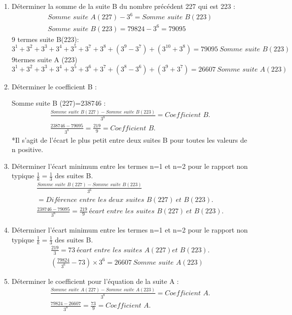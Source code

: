 \documentclass[11pt,a4paper]{article}
\begin{document}
\begin{enumerate}[label=\arabic*.,leftmargin=*,itemsep=6pt]
\item Déterminer la somme de la suite B du nombre précédent 227 qui est 223 :
\begin{gather*}
\textit{Somme suite A}(227)-3^{6}=\textit{Somme suite B}(223)\\
\textit{Somme suite B}(223)=79824-3^{6}=79095
\end{gather*}
9 termes suite B(223):
\[
3^{1}+3^{2}+3^{3}+3^{4}+3^{5}+3^{7}+3^{8}+(3^{9}-3^{7})+(3^{10}+3^{8})=79095\ \textit{Somme suite B}(223)
\]
9termes suite A (223)
\[
3^{1}+3^{2}+3^{3}+3^{4}+3^{5}+3^{6}+3^{7}+(3^{8}-3^{6})+(3^{9}+3^{7})=26607\ \textit{Somme suite A}(223)
\]

\item Déterminer le coefficient B :

Somme suite B (227)=238746 :
\begin{gather*}
\frac{\textit{Somme suite B}(227)-\textit{Somme suite B}(223)}{3^{8}}=\textit{Coefficient B}.\\
\frac{238746-79095}{3^{8}}=\frac{219}{9}=\textit{Coefficient B}.
\end{gather*}
*Il s’agit de l’écart le plus petit entre deux suites B pour toutes les valeurs de n positive.

\item Déterminer l’écart minimum entre les termes n=1 et n=2 pour le rapport non typique $\frac{1}{k}=\frac{1}{3}$ des suites B.
\begin{gather*}
\frac{\textit{Somme suite B}(227)-\textit{Somme suite B}(223)}{3^{6}}\\
=\textit{Diférence entre les deux suites B}(227)\ \textit{et B}(223).\\[6pt]
\frac{238746-79095}{3^{6}}=\frac{219}{9}\ \textit{écart entre les suites B}(227)\ \textit{et B}(223).
\end{gather*}

\item Déterminer l’écart minimum entre les termes n=1 et n=2 pour le rapport non typique $\frac{1}{k}=\frac{1}{3}$ des suites B.
\begin{gather*}
\frac{219}{3}=73\ \textit{écart entre les suites A}(227)\textit{et B}(223).\\[6pt]
\left(\frac{79824}{3^{6}}-73\right)\times3^{6}=26607\ \textit{Somme suite A}(223)
\end{gather*}

\item Déterminer le coefficient pour l’équation de la suite A :
\begin{gather*}
\frac{\textit{Somme suite A}(227)-\textit{Somme suite A}(223)}{3^{8}}=\textit{Coefficient A}.\\
\frac{79824-26607}{3^{8}}=\frac{73}{9}=\textit{Coefficient A}.
\end{gather*}


\end{enumerate}
\end{document}
